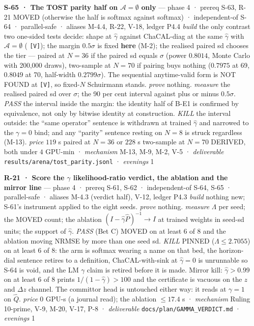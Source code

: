 \documentclass[11pt,a4paper]{article}
\theoremstyle{plain}
\theoremstyle{definition}
\theoremstyle{remark}
\begin{document}
\textbf{S-65 · The TOST parity half on \(\mathcal{A}=\emptyset\) only}
--- phase 4 · prereq S-63, R-21 MOVED (otherwise the half is softmax
against softmax) · independent-of S-64 · parallel-safe · aliases M-4.4,
R-22, V-18, ledger P4.4 \emph{build} the only contrast two one-sided
tests decide: shape at \(\hat\gamma\) against ChaCAL-diag at the same
\(\hat\gamma\) with \(\mathcal{A}=\emptyset\)
(\citep{schuirmann-1987-tost} \texttt{{[}V{]}}); the margin
\(0.5\sigma\) is fixed \textbf{here} (M-2); the realised paired sd
chooses the tier --- paired at \(N=36\) if the paired sd equals
\(\sigma\) (power \(0.8014\), Monte Carlo with 200,000 draws),
two-sample at \(N=70\) if pairing buys nothing (\(0.7975\) at 69,
\(0.8049\) at 70, half-width \(0.2799\sigma\)). The sequential
anytime-valid form is NOT FOUND at \texttt{{[}V{]}}, so fixed-\(N\)
Schuirmann stands. \emph{prove} nothing. \emph{measure} the realised
paired sd over \(\sigma\); the 90 per cent interval against plus or
minus \(0.5\sigma\). \emph{PASS} the interval inside the margin: the
identity half of B-E1 is confirmed by equivalence, not only by bitwise
identity at construction. \emph{KILL} the interval outside: the ``same
operator'' sentence is withdrawn at trained \(\hat\gamma\) and narrowed
to the \(\gamma=0\) bind; and any ``parity'' sentence resting on \(N=8\)
is struck regardless (M-13). \emph{price} \(119\) s paired at \(N=36\)
or \(228\) s two-sample at \(N=70\) DERIVED, both under \(4\) GPU-min ·
\emph{mechanism} M-13, M-9, M-2, V-5 · \emph{deliverable}
\texttt{results/arena/tost\_parity.jsonl} · \emph{evenings} 1

\textbf{R-21 · Score the \(\gamma\) likelihood-ratio verdict, the
ablation and the mirror line} --- phase 4 · prereq S-61, S-62 ·
independent-of S-64, S-65 · parallel-safe · aliases M-4.3 (verdict
half), V-12, ledger P4.3 \emph{build} nothing new; S-61's instrument
applied to the eight seeds. \emph{prove} nothing. \emph{measure}
\(\Lambda\) per seed; the MOVED count; the ablation
\((I-\hat\gamma\hat P)^{-1}\to I\) at trained weights in seed-sd units;
the support of \(\hat\gamma\). \emph{PASS} (Bet C) MOVED on at least 6
of 8 and the ablation moving NRMSE by more than one seed sd. \emph{KILL}
PINNED (\(\Lambda\le2.7055\)) on at least 6 of 8: the arm is softmax
wearing a name on that bed, the horizon-dial sentence retires to a
definition, ChaCAL-with-sink at \(\hat\gamma=0\) is unrunnable so S-64
is void, and the LM \(\gamma\) claim is retired before it is made.
Mirror kill: \(\hat\gamma>0.99\) on at least 6 of 8 prints
\(1/(1-\hat\gamma)>100\) and the certificate is vacuous on the \(z\) and
\(\Delta z\) channel. The committor head is untouched either way: it
reads at \(\gamma=1\) on \(\hat Q\). \emph{price} \(0\) GPU-s (a journal
read); the ablation \(\le17.4\) s · \emph{mechanism} Ruling 10-prime,
V-9, M-20, V-17, P-8 · \emph{deliverable}
\texttt{docs/plan/GAMMA\_VERDICT.md} · \emph{evenings} 1
\end{document}
